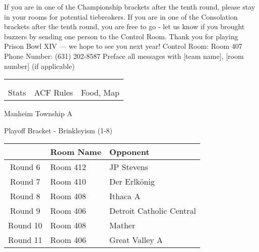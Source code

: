 \documentclass{article}%
\begin{document}
\vspace*{30pt}%
\linebreak%
If you are in one of the Championship brackets after the tenth round, please stay in your rooms for potential tiebreakers.\newline%
\newline%
If you are in one of the Consolation brackets after the tenth round, you are free to go {-} let us know if you brought buzzers by sending one person to the Control Room.\newline%
\newline%
Thank you for playing Prison Bowl XIV — we hope to see you next year!\newline%
\newline%
Control Room: Room 407\newline%
Phone Number: (631) 202{-}8587\newline%
Preface all messages with {[}team name{]}, {[}room number{]} (if applicable)%
\vspace*{30pt}%
\newline%
%
\begin{tabularx}{\textwidth}{YYY}%
  &  &  \\%
\\%
Stats&ACF Rules&Food, Map\\%
\end{tabularx}%
\newpage%
\begin{center}%
\begin{Huge}%
Manheim Township A%
\end{Huge}%
\vspace*{12pt}%
\linebreak%
\begin{Large}%
Playoff Bracket {-} Brinkleyism (1{-}8)%
\end{Large}%
\end{center}%
\vspace*{4pt}%
%
\begin{tabularx}{\textwidth}{|c|Y|Y|}%
\hline%
&Room Name&Opponent\\%
\hline%
Round 6&Room 412&JP Stevens\\%
Round 7&Room 410&Der Erlkönig\\%
Round 8&Room 408&Ithaca A\\%
Round 9&Room 406&Detroit Catholic Central\\%
Round 10&Room 408&Mather\\%
Round 11&Room 406&Great Valley A\\%
\hline%
\end{tabularx}%
\end{document}
